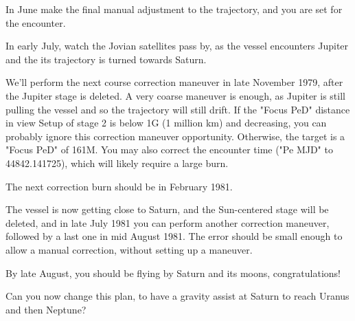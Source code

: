 \documentclass[Orbiter User Manual.tex]{subfiles}
\begin{document}
In June make the final manual adjustment to the trajectory, and you are set for
the encounter.

In early July, watch the Jovian satellites pass by, as the vessel encounters
Jupiter and the its trajectory is turned towards Saturn.

We'll perform the next course correction maneuver in late November 1979, after
the Jupiter stage is deleted. A very coarse maneuver is enough, as Jupiter is
still pulling the vessel and so the trajectory will still drift. If the "Focus
PeD" distance in view Setup of stage 2 is below 1G (1 million km) and
decreasing, you can probably ignore this correction maneuver opportunity.
Otherwise, the target is a "Focus PeD" of 161M. You may also correct the
encounter time ("Pe MJD" to 44842.141725), which will likely require a large
burn.

The next correction burn should be in February 1981.

The vessel is now getting close to Saturn, and the Sun-centered stage will be
deleted, and in late July 1981 you can perform another correction maneuver,
followed by a last one in mid August 1981. The error should be small enough to
allow a manual correction, without setting up a maneuver.

By late August, you should be flying by Saturn and its moons, congratulations!

Can you now change this plan, to have a gravity assist at Saturn to reach Uranus
and then Neptune?
\end{document}
